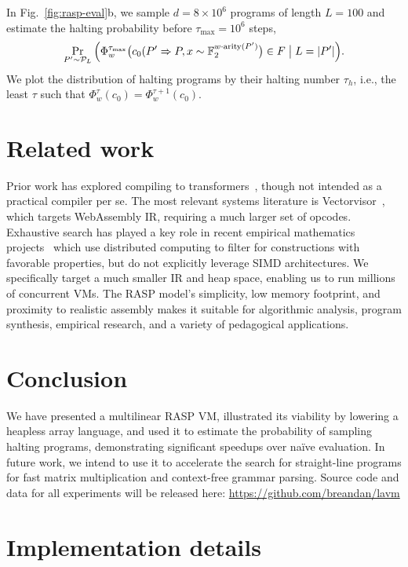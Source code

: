 \documentclass[sigplan,nonacm]{acmart}\settopmatter{printfolios=false,printccs=false,printacmref=false}
\begin{document}
\noindent In Fig.~\ref{fig:rasp-eval}b, we sample $d=8\times 10^6$ programs of length $L=100$ and estimate the halting probability before $\tau_{\max}=10^6$ steps, \[\Pr_{P' \sim \mathcal P_L}\Big(\Phi_w^{\tau_{\max}}\bigl(c_0(P'\Rightarrow P, x\sim \mathbb{F}_2^{w\cdot\text{arity}(P')}\bigr)\in F \bigm\vert L = |P'|\Big).\]
We plot the distribution of halting programs by their halting number $\tau_h$, i.e., the least $\tau$ such that $\Phi_w^\tau(c_0)=\Phi_w^{\tau+1}(c_0)$.

\section{Related work}

Prior work has explored compiling to transformers~\cite{weiss2021thinking}, though not intended as a practical compiler per se. The most relevant systems literature is Vectorvisor~\cite{ginzburg2023vectorvisor}, which targets WebAssembly IR, requiring a much larger set of opcodes. Exhaustive search has played a key role in recent empirical mathematics projects~\cite{blanchard2025determination, kauers2023flip} which use distributed computing to filter for constructions with favorable properties, but do not explicitly leverage SIMD architectures. We specifically target a much smaller IR and heap space, enabling us to run millions of concurrent VMs. The RASP model's simplicity, low memory footprint, and proximity to realistic assembly makes it suitable for algorithmic analysis, program synthesis, empirical research, and a variety of pedagogical applications.

\section{Conclusion}

We have presented a multilinear RASP VM, illustrated its viability by lowering a heapless array language, and used it to estimate the probability of sampling halting programs, demonstrating significant speedups over na\"ive evaluation. In future work, we intend to use it to accelerate the search for straight-line programs for fast matrix multiplication and context-free grammar parsing. Source code and data for all experiments will be released here: \href{https://github.com/breandan/lavm}{https://github.com/breandan/lavm}


\appendix
\vspace{-0.2cm}
\section{Implementation details}\label{sec:impl}
\end{document}
